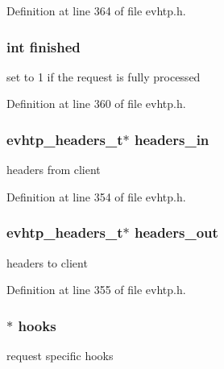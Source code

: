 Definition at line 364 of file evhtp.h.

\hypertarget{structevhtp__request__s_a49c6e6c75d41d6360253beb518425934}{
\subsubsection[{finished}]{\setlength{\rightskip}{0pt plus 5cm}int {\bf finished}}}
\label{structevhtp__request__s_a49c6e6c75d41d6360253beb518425934}
set to 1 if the request is fully processed 

Definition at line 360 of file evhtp.h.

\hypertarget{structevhtp__request__s_a231fb5c9d95add6d73b4500233a98de8}{
\subsubsection[{headers\_\-in}]{\setlength{\rightskip}{0pt plus 5cm}evhtp\_\-headers\_\-t$\ast$ {\bf headers\_\-in}}}
\label{structevhtp__request__s_a231fb5c9d95add6d73b4500233a98de8}
headers from client 

Definition at line 354 of file evhtp.h.

\hypertarget{structevhtp__request__s_a139e220680f914ac7a44f3dac1b34be0}{
\subsubsection[{headers\_\-out}]{\setlength{\rightskip}{0pt plus 5cm}evhtp\_\-headers\_\-t$\ast$ {\bf headers\_\-out}}}
\label{structevhtp__request__s_a139e220680f914ac7a44f3dac1b34be0}
headers to client 

Definition at line 355 of file evhtp.h.

\hypertarget{structevhtp__request__s_ac97663394f74c9030e57c771cfb7981e}{
\subsubsection[{hooks}]{$\ast$ {\bf hooks}}}
\label{structevhtp__request__s_ac97663394f74c9030e57c771cfb7981e}
request specific hooks 

